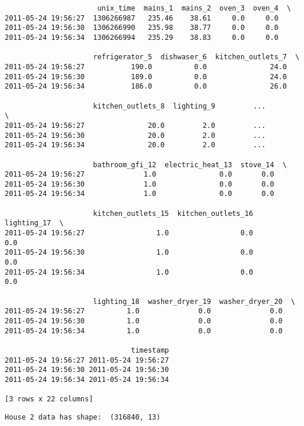 \documentclass[11pt]{article}
\begin{document}
    
    \begin{verbatim}
                      unix_time  mains_1  mains_2  oven_3  oven_4  \
2011-05-24 19:56:27  1306266987   235.46    38.61     0.0     0.0   
2011-05-24 19:56:30  1306266990   235.98    38.77     0.0     0.0   
2011-05-24 19:56:34  1306266994   235.29    38.83     0.0     0.0   

                     refrigerator_5  dishwaser_6  kitchen_outlets_7  \
2011-05-24 19:56:27           190.0          0.0               24.0   
2011-05-24 19:56:30           189.0          0.0               24.0   
2011-05-24 19:56:34           186.0          0.0               26.0   

                     kitchen_outlets_8  lighting_9         ...          \
2011-05-24 19:56:27               20.0         2.0         ...           
2011-05-24 19:56:30               20.0         2.0         ...           
2011-05-24 19:56:34               20.0         2.0         ...           

                     bathroom_gfi_12  electric_heat_13  stove_14  \
2011-05-24 19:56:27              1.0               0.0       0.0   
2011-05-24 19:56:30              1.0               0.0       0.0   
2011-05-24 19:56:34              1.0               0.0       0.0   

                     kitchen_outlets_15  kitchen_outlets_16  lighting_17  \
2011-05-24 19:56:27                 1.0                 0.0          0.0   
2011-05-24 19:56:30                 1.0                 0.0          0.0   
2011-05-24 19:56:34                 1.0                 0.0          0.0   

                     lighting_18  washer_dryer_19  washer_dryer_20  \
2011-05-24 19:56:27          1.0              0.0              0.0   
2011-05-24 19:56:30          1.0              0.0              0.0   
2011-05-24 19:56:34          1.0              0.0              0.0   

                              timestamp  
2011-05-24 19:56:27 2011-05-24 19:56:27  
2011-05-24 19:56:30 2011-05-24 19:56:30  
2011-05-24 19:56:34 2011-05-24 19:56:34  

[3 rows x 22 columns]
    \end{verbatim}

    
    \begin{Verbatim}[commandchars=\\\{\}]
House 2 data has shape:  (316840, 13)

    \end{Verbatim}
\end{document}
